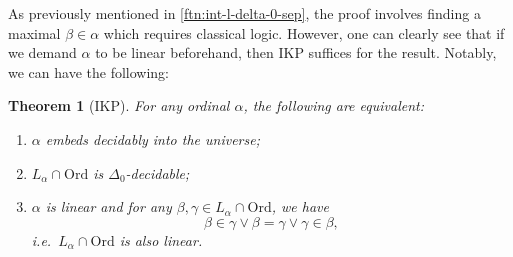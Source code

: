 \documentclass[12pt,openany]{book}
\theoremstyle{plain}
\newtheorem{theorem}{Theorem}[section]
\theoremstyle{definition}
\newcommand\uplabel[1]{\textup{(#1)}}
\newcommand\IKP{\mathrm{IKP}}
\newcommand\Ord{\mathrm{Ord}}
\begin{document}
As previously mentioned in \autoref{ftn:int-l-delta-0-sep}, the proof involves finding a maximal $\beta \in \alpha$ which requires classical logic. However, one can clearly see that if we demand $\alpha$ to be linear beforehand, then $\IKP$ suffices for the result. Notably, we can have the following:
\begin{theorem}[$\IKP$]
  \label{thm:ord-cla-emb-equiv-form}
  For any ordinal $\alpha$, the following are equivalent:
  \begin{enumerate}[label=\uplabel{\arabic*}]
    \item \label{itm:ord-cla-emb-equiv-form-l-emb} $\alpha$ embeds decidably into the universe;
    \item \label{itm:ord-cla-emb-equiv-form-ord-emb} $L_\alpha \cap \Ord$ is $\Delta_0$-decidable;
    \item \label{itm:ord-cla-emb-equiv-form-atom-dec} $\alpha$ is linear and for any $\beta, \gamma \in L_\alpha \cap \Ord$, we have
          \[\beta \in \gamma \lor \beta = \gamma \lor \gamma \in \beta,\]
          i.e.\ $L_\alpha \cap \Ord$ is also linear.
  \end{enumerate}
\end{theorem}
\end{document}
